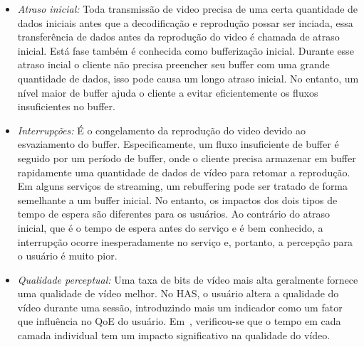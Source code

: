 
\begin{itemize}
\vspace{-0.05cm}
\item \textit{Atraso inicial:} Toda transmissão de video precisa de uma certa quantidade de dados iniciais antes que a decodificação e reprodução possar ser inciada, essa transferência de dados antes da reprodução do video é chamada de atraso inicial. Está fase também é conhecida como bufferização inicial. Durante esse atraso incial o cliente não precisa preencher seu buffer com uma grande quantidade de dados, isso pode causa um longo atraso inicial. No entanto, um nível maior de buffer ajuda o cliente a evitar eficientemente os fluxos insuficientes no buffer.
\vspace{-0.05cm}
\item \textit{Interrupções:} É o congelamento da reprodução do video devido ao esvaziamento do buffer. Especificamente, um fluxo insuficiente de buffer é seguido por um período de buffer, onde o cliente precisa armazenar em buffer rapidamente uma quantidade de dados de vídeo para retomar a reprodução. 
Em alguns serviços de streaming, um rebuffering pode ser tratado de forma semelhante a um buffer inicial. No entanto, os impactos dos dois tipos de tempo de espera são diferentes para os usuários. Ao contrário do atraso inicial, que é o tempo de espera antes do serviço e é bem conhecido, a interrupção ocorre inesperadamente no serviço e, portanto, a percepção para o usuário é muito pior.%
\vspace{-0.05cm}
\item \textit{Qualidade perceptual:}
Uma taxa de bits de vídeo mais alta geralmente fornece uma qualidade de vídeo melhor. 
No HAS, o usuário altera a qualidade do vídeo durante uma sessão, introduzindo mais um indicador como um fator que influência no QoE do usuário. 
Em~\cite{HoBfeld2014QoMEX}, verificou-se que o tempo em cada camada individual tem um impacto significativo na qualidade do vídeo.

\end{itemize}
